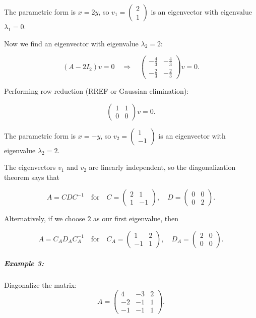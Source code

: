 \documentclass[a4paper,12pt]{article}
\begin{document}
The parametric form is \( x = 2y \), so \( v_1 = \begin{pmatrix} 2 \\ 1 \end{pmatrix} \) is an eigenvector with eigenvalue \( \lambda_1 = 0 \).

Now we find an eigenvector with eigenvalue \( \lambda_2 = 2 \):

\[
(A - 2I_2) v = 0 \quad \Rightarrow \quad \begin{pmatrix} -\frac{4}{3} & -\frac{4}{3} \\ -\frac{2}{3} & -\frac{2}{3} \end{pmatrix} v = 0.
\]

Performing row reduction (RREF or Gaussian elimination):

\[
\begin{pmatrix} 1 & 1 \\ 0 & 0 \end{pmatrix} v = 0.
\]

The parametric form is \( x = -y \), so \( v_2 = \begin{pmatrix} 1 \\ -1 \end{pmatrix} \) is an eigenvector with eigenvalue \( \lambda_2 = 2 \).

The eigenvectors \( v_1 \) and \( v_2 \) are linearly independent, so the diagonalization theorem says that

\[
A = C D C^{-1} \quad \text{for} \quad C = \begin{pmatrix} 2 & 1 \\ 1 & -1 \end{pmatrix}, \quad D = \begin{pmatrix} 0 & 0 \\ 0 & 2 \end{pmatrix}.
\]

Alternatively, if we choose \( 2 \) as our first eigenvalue, then

\[
A = C_A D_A C_A^{-1} \quad \text{for} \quad C_A = \begin{pmatrix} 1 & 2 \\ -1 & 1 \end{pmatrix}, \quad D_A = \begin{pmatrix} 2 & 0 \\ 0 & 0 \end{pmatrix}.
\]

\subparagraph{Example 3:}Diagonalize the matrix:
\[
A = \begin{pmatrix}
4 & -3 & 2 \\
-2 & -1 & 1 \\
-1 & -1 & 1
\end{pmatrix}.
\]
\end{document}
